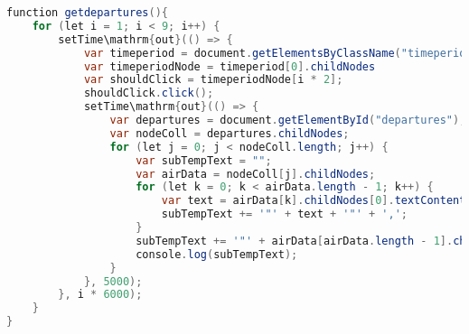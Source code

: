 \documentclass{cumcmthesis}
\begin{document}
\begin{appendices}
\begin{lstlisting}[language=java]
function getdepartures(){
    for (let i = 1; i < 9; i++) {
        setTime\mathrm{out}(() => {
            var timeperiod = document.getElementsByClassName("timeperiod");
            var timeperiodNode = timeperiod[0].childNodes
            var shouldClick = timeperiodNode[i * 2];
            shouldClick.click();
            setTime\mathrm{out}(() => {
                var departures = document.getElementById("departures");
                var nodeColl = departures.childNodes;
                for (let j = 0; j < nodeColl.length; j++) {
                    var subTempText = "";
                    var airData = nodeColl[j].childNodes;
                    for (let k = 0; k < airData.length - 1; k++) {
                        var text = airData[k].childNodes[0].textContent;
                        subTempText += '"' + text + '"' + ',';
                    }
                    subTempText += '"' + airData[airData.length - 1].childNodes[0].textContent + '"';
                    console.log(subTempText);
                }
            }, 5000);
        }, i * 6000);
    }    
}

\end{lstlisting}
\end{appendices}
\end{document}

